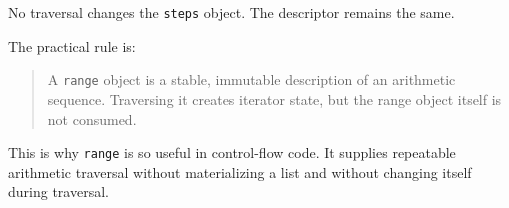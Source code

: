 No traversal changes the \texttt{steps} object. The descriptor remains the same.

The practical rule is:

\begin{quote}
A \texttt{range} object is a stable, immutable description of an arithmetic sequence. Traversing it creates iterator state, but the range object itself is not consumed.
\end{quote}

This is why \texttt{range} is so useful in control-flow code. It supplies repeatable arithmetic traversal without materializing a list and without changing itself during traversal.